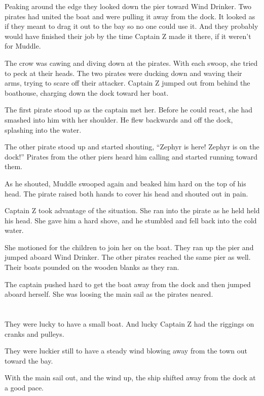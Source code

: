 \documentclass[12pt]{extbook}
\begin{document}
  Peaking around the edge they looked down the pier toward Wind Drinker.
  Two pirates had united the boat and were pulling it away from the dock.
  It looked as if they meant to drag it out to the bay so no one could use
  it. And they probably would have finished their job by the time Captain
  Z made it there, if it weren't for Muddle.
  
  The crow was cawing and diving down at the pirates. With each swoop, she
  tried to peck at their heads. The two pirates were ducking down and
  waving their arms, trying to scare off their attacker. Captain Z jumped
  out from behind the boathouse, charging down the dock toward her boat.
  
  The first pirate stood up as the captain met her. Before he could react,
  she had smashed into him with her shoulder. He flew backwards and off
  the dock, splashing into the water.
  
  The other pirate stood up and started shouting, \enquote{Zephyr is here!
  Zephyr is on the dock!} Pirates from the other piers heard him calling
  and started running toward them.
  
  As he shouted, Muddle swooped again and beaked him hard on the top of
  his head. The pirate raised both hands to cover his head and shouted out
  in pain.
  
  Captain Z took advantage of the situation. She ran into the pirate as he
  held held his head. She gave him a hard shove, and he stumbled and fell
  back into the cold water.
  
  She motioned for the children to join her on the boat. They ran up the
  pier and jumped aboard Wind Drinker. The other pirates reached the same
  pier as well. Their boats pounded on the wooden blanks as they ran.
  
  The captain pushed hard to get the boat away from the dock and then
  jumped aboard herself. She was loosing the main sail as the pirates
  neared.
  
  \section{}\label{section-35}
  
  They were lucky to have a small boat. And lucky Captain Z had the
  riggings on cranks and pulleys.
  
  They were luckier still to have a steady wind blowing away from the town
  out toward the bay.
  
  With the main sail out, and the wind up, the ship shifted away from the
  dock at a good pace.
  
\end{document}
